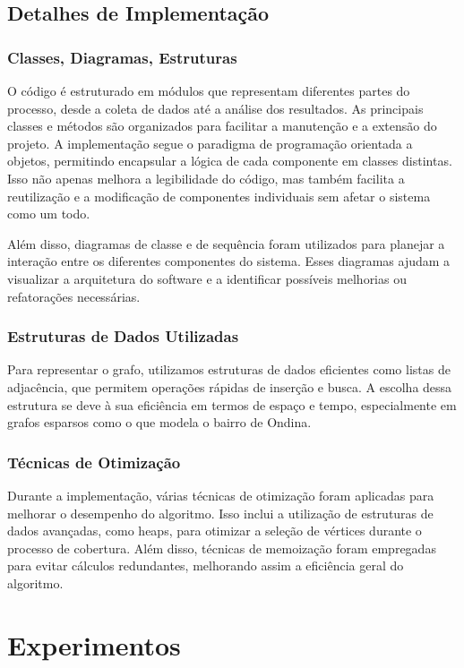 \documentclass[12pt, a4paper]{report}
\begin{document}
\section{Detalhes de Implementação}
\subsection{Classes, Diagramas, Estruturas}
O código é estruturado em módulos que representam diferentes partes do processo, desde a coleta de dados até a análise dos resultados. As principais classes e métodos são organizados para facilitar a manutenção e a extensão do projeto. A implementação segue o paradigma de programação orientada a objetos, permitindo encapsular a lógica de cada componente em classes distintas. Isso não apenas melhora a legibilidade do código, mas também facilita a reutilização e a modificação de componentes individuais sem afetar o sistema como um todo.

Além disso, diagramas de classe e de sequência foram utilizados para planejar a interação entre os diferentes componentes do sistema. Esses diagramas ajudam a visualizar a arquitetura do software e a identificar possíveis melhorias ou refatorações necessárias.

\subsection{Estruturas de Dados Utilizadas}
Para representar o grafo, utilizamos estruturas de dados eficientes como listas de adjacência, que permitem operações rápidas de inserção e busca. A escolha dessa estrutura se deve à sua eficiência em termos de espaço e tempo, especialmente em grafos esparsos como o que modela o bairro de Ondina.

\subsection{Técnicas de Otimização}
Durante a implementação, várias técnicas de otimização foram aplicadas para melhorar o desempenho do algoritmo. Isso inclui a utilização de estruturas de dados avançadas, como heaps, para otimizar a seleção de vértices durante o processo de cobertura. Além disso, técnicas de memoização foram empregadas para evitar cálculos redundantes, melhorando assim a eficiência geral do algoritmo.

\chapter{Experimentos}
\end{document}
